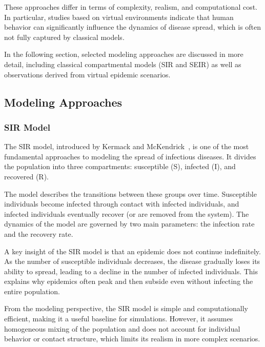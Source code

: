 \documentclass[english]{projectreport}
\begin{document}
These approaches differ in terms of complexity, realism, and computational cost. In particular, studies based on virtual environments indicate that human behavior can significantly influence the dynamics of disease spread, which is often not fully captured by classical models.

In the following section, selected modeling approaches are discussed in more detail, including classical compartmental models (SIR and SEIR) as well as observations derived from virtual epidemic scenarios.

\subsection{Modeling Approaches}
\label{sec:modeling-approaches}

\subsubsection{SIR Model}
\label{sec:sir}

The SIR model, introduced by Kermack and McKendrick~\cite{kermack1927sir}, is one of the most fundamental approaches to modeling the spread of infectious diseases. It divides the population into three compartments: susceptible (S), infected (I), and recovered (R).

The model describes the transitions between these groups over time. Susceptible individuals become infected through contact with infected individuals, and infected individuals eventually recover (or are removed from the system). The dynamics of the model are governed by two main parameters: the infection rate and the recovery rate.

A key insight of the SIR model is that an epidemic does not continue indefinitely. As the number of susceptible individuals decreases, the disease gradually loses its ability to spread, leading to a decline in the number of infected individuals. This explains why epidemics often peak and then subside even without infecting the entire population.

From the modeling perspective, the SIR model is simple and computationally efficient, making it a useful baseline for simulations. However, it assumes homogeneous mixing of the population and does not account for individual behavior or contact structure, which limits its realism in more complex scenarios.
\end{document}
